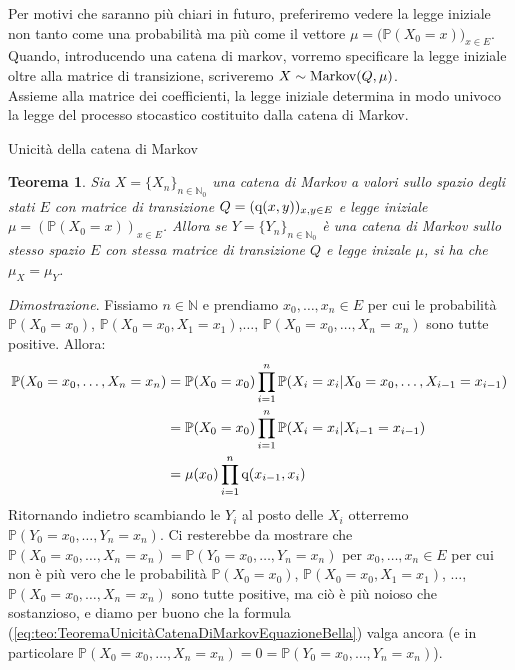 \documentclass[11pt]{book}
\makeatletter
\theoremstyle{Definizione}
\theoremstyle{TeoremaProposizioneLemmaCorollario}
\newtheorem{myteo}{Teorema}[section]
\theoremstyle{OsservazioneNota}
\renewenvironment{proof}[1][\proofname]{\par
  \normalfont \topsep6\p@\@plus6\p@\relax
  \trivlist
  \item[\hskip\labelsep
        \itshape
    #1\@addpunct{.}]\ignorespaces
}{%
  \endtrivlist\@endpefalse
}
\newcommand{\N}{\mathbb{N}}
\renewcommand{\P}{\mathbb{P}}
\newcommand{\q}{\textup{q}}
\renewenvironment{proof}{\textsl{Dimostrazione}.}{}
\makeatother
\begin{document}
\noindent
Per motivi che saranno più chiari in futuro, preferiremo vedere la legge iniziale non tanto come una probabilità ma più come il vettore $\mu = \big(\P(X_0 = x)\big)_{x\in E}$.\\
Quando, introducendo una catena di markov, vorremo specificare la legge iniziale oltre alla matrice di transizione, scriveremo $X \sim \textup{Markov}(Q,\mu)$.\\
Assieme alla matrice dei coefficienti, la legge iniziale determina in modo univoco la legge del processo stocastico costituito dalla catena di Markov.
\begin{boxteo}{Unicità della catena di Markov}
\begin{myteo}\label{teo:TeoremaUnicitàCatenaDiMarkov}
Sia $X = \{X_n\}_{n\in \N_0}$ una catena di Markov a valori sullo spazio degli stati $E$ con matrice di transizione $Q = (\q(x,y))_{x,y\in E}$ e legge iniziale $\mu = (\P(X_0 = x))_{x\in E}$. Allora se $Y = \{Y_n\}_{n \in \N_0}$ è una catena di Markov sullo stesso spazio $E$ con stessa matrice di transizione $Q$ e legge inizale $\mu$, si ha che $\mu_X = \mu_Y$.
\end{myteo}
\tcblower
\begin{proof}
Fissiamo $n\in \N$ e prendiamo $x_0,\dots,x_n\in E$ per cui le probabilità $\P(X_0 = x_0)$, $\P(X_0 = x_0, X_1 = x_1)$,$\dots$, $\P(X_0 = x_0,\dots,X_n = x_n)$ sono tutte positive. Allora:
\begin{align}\label{eq:teo:TeoremaUnicitàCatenaDiMarkovEquazioneBella}
\P(X_0 = x_0,\dots,X_n = x_n) &= \P(X_0 = x_0) \prod_{i = 1}^n \P(X_i = x_i | X_0 = x_0,\dots,X_{i-1} = x_{i-1}) \nonumber\\
&= \P(X_0 = x_0) \prod_{i = 1}^n \P(X_i = x_i| X_{i-1} = x_{i-1}) \nonumber\\
&= \mu(x_0) \prod_{i = 1}^n \q(x_{i-1},x_i) 
\end{align}
Ritornando indietro scambiando le $Y_i$ al posto delle $X_i$ otterremo $\P(Y_0 = x_0,\dots,Y_n = x_n)$.
Ci resterebbe da mostrare che $\P(X_0 = x_0,\dots,X_n = x_n) = \P(Y_0 = x_0,\dots,Y_n = x_n)$ per $x_0,\dots,x_n\in E$ per cui non è più vero che le probabilità $\P(X_0 = x_0)$, $\P(X_0 = x_0, X_1 = x_1)$, $\dots$, $\P(X_0 = x_0,\dots,X_n = x_n)$ sono tutte positive, ma ciò è più noioso che sostanzioso, e diamo per buono che la formula (\ref{eq:teo:TeoremaUnicitàCatenaDiMarkovEquazioneBella}) valga ancora (e in particolare $\P(X_0 = x_0,\dots,X_n = x_n) = 0 = \P(Y_0 = x_0,\dots,Y_n = x_n)$).
\end{proof}
\end{boxteo}
\end{document}
